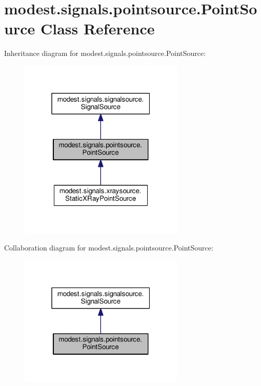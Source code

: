 \hypertarget{classmodest_1_1signals_1_1pointsource_1_1PointSource}{}\section{modest.\+signals.\+pointsource.\+Point\+Source Class Reference}
\label{classmodest_1_1signals_1_1pointsource_1_1PointSource}


Inheritance diagram for modest.\+signals.\+pointsource.\+Point\+Source\+:\nopagebreak
\begin{figure}[H]
\begin{center}
\leavevmode
\includegraphics[width=223pt]{classmodest_1_1signals_1_1pointsource_1_1PointSource__inherit__graph}
\end{center}
\end{figure}


Collaboration diagram for modest.\+signals.\+pointsource.\+Point\+Source\+:\nopagebreak
\begin{figure}[H]
\begin{center}
\leavevmode
\includegraphics[width=223pt]{classmodest_1_1signals_1_1pointsource_1_1PointSource__coll__graph}
\end{center}
\end{figure}
